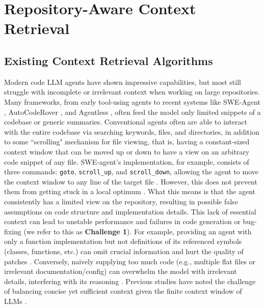 \chapter{Repository-Aware Context Retrieval}
\label{cha:ch1}

\section{Existing Context Retrieval Algorithms}

Modern code LLM agents have shown impressive capabilities, but most still struggle with incomplete or irrelevant context when working on large repositories. Many frameworks, from early tool-using agents to recent systems like SWE-Agent \cite{yang2024sweagent}, AutoCodeRover \cite{zhang2024autocoderover}, and Agentless \cite{xia2024agentlessdemystifyingllmbasedsoftware}, often feed the model only limited snippets of a codebase or generic summaries. Conventional agents often are able to interact with the entire codebase via searching keywords, files, and directories, in addition to some ``scrolling" mechanism for file viewing, { that is, having a constant-sized context window that can be moved up or down to have a view on an arbitrary code snippet of any file. SWE-agent's implementation, for example, consists of three commands: \verb|goto|, \verb|scroll_up|, and \verb|scroll_down|, allowing the agent to move the context window to any line of the target file \cite{yang2024sweagent}}. However, this does not prevent them from getting stuck in a local optimum \cite{ouyang2025repographenhancingaisoftware} . { What this means is that the agent consistently has a limited view on the repository, resulting in possible false assumptions on code structure and implementation details.} This lack of essential context can lead to unstable performance and failures in code generation or bug-fixing (we refer to this as \textbf{Challenge 1}). For example, providing an agent with only a function implementation but not definitions of its referenced symbols (classes, functions, etc.) can omit crucial information and hurt the quality of patches . Conversely, naively supplying too much code (e.g., multiple flat files or irrelevant documentation/config) can overwhelm the model with irrelevant details, interfering with its reasoning \cite{zhang2024hierarchicalcontextpruningoptimizing, zhang2024inftybenchextendinglongcontext}. Previous studies have noted the challenge of balancing concise yet sufficient context given the finite context window of LLMs \cite{ouyang2025repographenhancingaisoftware}.

